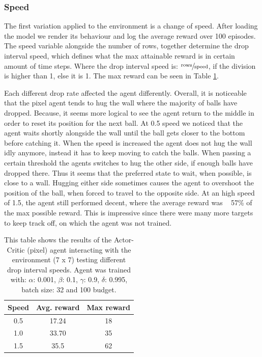 \documentclass{article}
\begin{document}
\subsubsection{Speed}
The first variation applied to the environment is a change of speed.
After loading the model we render its behaviour and log the average reward over 100 episodes. 
The speed variable alongside the number of rows, together determine the drop interval speed, which defines what the max attainable reward is in certain amount of time steps. 
Where the drop interval speed is: $\sfrac{\text{rows}}{\text{speed}}$, if the division is higher than 1, else it is 1. 
The max reward can be seen in Table \ref{tab:Pixel-speed}. 

Each different drop rate affected the agent differently. 
Overall, it is noticeable that the pixel agent tends to hug the wall where the majority of balls have dropped.
Because, it seems more logical to see the agent return to the middle in order to reset its position for the next ball.
At 0.5 speed we noticed that the agent waits shortly alongside the wall until the ball gets closer to the bottom before catching it. 
When the speed is increased the agent does not hug the wall idly anymore, instead it has to keep moving to catch the balls. 
When passing a certain threshold the agents switches to hug the other side, if enough balls have dropped there. 
Thus it seems that the preferred state to wait, when possible, is close to a wall. 
Hugging either side sometimes causes the agent to overshoot the position of the ball, when forced to travel to the opposite side. 
At an high speed of 1.5, the agent still performed decent, where the average reward was ~ 57\% of the max possible reward. 
This is impressive since there were many more targets to keep track off, on which the agent was not trained. 

\begin{table}[]
    \centering
    \begin{tabular}{|c|c|c|}
        \hline
        \textbf{Speed} & \textbf{Avg. reward} & \textbf{Max reward} \\
        \hline
        0.5   & 17.24       & 18                  \\
        1.0   & 33.70       & 35                  \\
        1.5   & 35.5        & 62          \\
        \hline          
    \end{tabular}
    \caption{This table shows the results of the Actor-Critic (pixel) agent interacting with the environment (7 x 7) testing different drop interval speeds.  Agent was trained with: $\alpha$: 0.001, $\beta$: 0.1, $\gamma$: 0.9, $\delta$: 0.995, batch size: 32 and 100 budget. }
    \label{tab:Pixel-speed}
\end{table}
\end{document}
